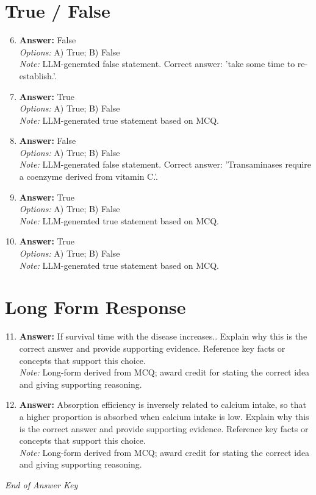\documentclass[12pt]{article}
\begin{document}
\section*{True / False}
\begin{enumerate}[label=\arabic*.]
\setcounter{enumi}{5}
\item \textbf{Answer:} False
\\ \textit{Options:} A) True; B) False
\\ \textit{Note:} LLM-generated false statement. Correct answer: 'take some time to re-establish.'.
\item \textbf{Answer:} True
\\ \textit{Options:} A) True; B) False
\\ \textit{Note:} LLM-generated true statement based on MCQ.
\item \textbf{Answer:} False
\\ \textit{Options:} A) True; B) False
\\ \textit{Note:} LLM-generated false statement. Correct answer: 'Transaminases require a coenzyme derived from vitamin C.'.
\item \textbf{Answer:} True
\\ \textit{Options:} A) True; B) False
\\ \textit{Note:} LLM-generated true statement based on MCQ.
\item \textbf{Answer:} True
\\ \textit{Options:} A) True; B) False
\\ \textit{Note:} LLM-generated true statement based on MCQ.
\end{enumerate}

\section*{Long Form Response}
\begin{enumerate}[label=\arabic*.]
\setcounter{enumi}{10}
\item \textbf{Answer:} If survival time with the disease increases.. Explain why this is the correct answer and provide supporting evidence. Reference key facts or concepts that support this choice.
\\ \textit{Note:} Long-form derived from MCQ; award credit for stating the correct idea and giving supporting reasoning.
\item \textbf{Answer:} Absorption efficiency is inversely related to calcium intake, so that a higher proportion is absorbed when calcium intake is low. Explain why this is the correct answer and provide supporting evidence. Reference key facts or concepts that support this choice.
\\ \textit{Note:} Long-form derived from MCQ; award credit for stating the correct idea and giving supporting reasoning.
\end{enumerate}

\vfill
\noindent\textit{End of Answer Key}
\end{document}
